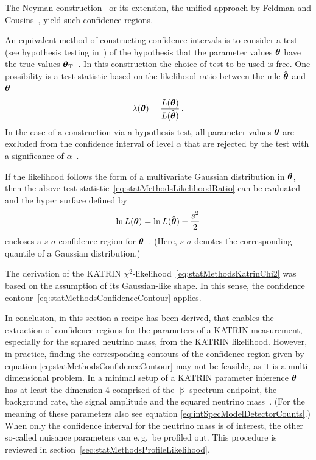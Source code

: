 The Neyman construction~\cite{Neyman1937} or its extension, the unified approach by Feldman and Cousins~\cite{Feldman1998}, yield such confidence regions.

An equivalent method of constructing confidence intervals is to consider a test (see hypothesis testing in~\cite{ReviewOfParticlePhysics}) of the hypothesis that the parameter values $\boldsymbol{\mathbf{\theta}}$ have the true values $\boldsymbol{\mathbf{\theta}}_\mathrm{T}$~\cite{ReviewOfParticlePhysics}. In this construction the choice of test to be used is free. One possibility is a test statistic based on the likelihood ratio between the \gls{mle} $\hat{\boldsymbol{\mathbf{\theta}}}$ and $\boldsymbol{\mathbf{\theta}}$~\cite{ReviewOfParticlePhysics}
\begin{equation}
	\label{eq:statMethodsLikelihoodRatio}
	\lambda(\boldsymbol{\mathbf{\theta}}) =
	\frac{L(\boldsymbol{\mathbf{\theta}})}{L(\hat{\boldsymbol{\mathbf{\theta}}})}
	\text{\,.}
\end{equation}
In the case of a construction via a hypothesis test, all parameter values $\boldsymbol{\mathbf{\theta}}$ are excluded from the confidence interval of level $\alpha$ that are rejected by the test with a significance of $\alpha$~\cite{ReviewOfParticlePhysics}.

If the likelihood follows the form of a multivariate Gaussian distribution in $\boldsymbol{\mathbf{\theta}}$, then the above test statistic~\eqref{eq:statMethodsLikelihoodRatio} can be evaluated and the hyper surface defined by
\begin{equation}
	\label{eq:statMethodsConfidenceContour}
	\ln L(\boldsymbol{\mathbf{\theta}}) = 	\ln L(\hat{\boldsymbol{\mathbf{\theta}}}) - \frac{s^2}{2}
\end{equation}
encloses a $s$-$\sigma$ confidence region for $\boldsymbol{\mathbf{\theta}}$~\cite{ReviewOfParticlePhysics}. (Here, $s$-$\sigma$ denotes the corresponding quantile of a Gaussian distribution.) 

The derivation of the KATRIN $\chi^2$-likelihood~\eqref{eq:statMethodsKatrinChi2} was based on the assumption of its Gaussian-like shape. In this sense, the confidence contour~\eqref{eq:statMethodsConfidenceContour} applies. 

In conclusion, in this section a recipe has been derived, that enables the extraction of confidence regions for the parameters of a KATRIN measurement, especially for the squared neutrino mass, from the KATRIN likelihood. However, in practice, finding the corresponding contours of the confidence region given by equation \ref{eq:statMethodsConfidenceContour} may not be feasible, as it is a multi-dimensional problem. In a minimal setup of a KATRIN parameter inference $\boldsymbol{\mathbf{\theta}}$ has at least the dimension 4 comprised of the $\upbeta$-spectrum endpoint, the background rate, the signal amplitude and the squared neutrino mass~\cite{Kleesiek2014}. (For the meaning of these parameters also see equation \eqref{eq:intSpecModelDetectorCounts}.) When only the confidence interval for the neutrino mass is of interest, the other so-called nuisance parameters can e.\,g.~be profiled out. This procedure is reviewed in section~\ref{sec:statMethodsProfileLikelihood}.

